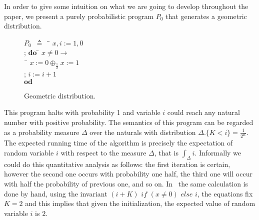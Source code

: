\documentclass{eptcs}
\theoremstyle{plain}
\theoremstyle{definition}
\newcommand{\Prg}{P}
\newcommand{\Def}{\ensuremath{\triangleq}}
\newcommand{\ra}{\ensuremath{\rightarrow}}
\newcommand{\DO}[0]{\textbf{do}}
\newcommand{\OD}[0]{\textbf{od}}
\begin{document}
In order to give some intuition on what we are going to develop throughout the paper, we present a purely probabilistic program $\Prg_0$ that generates a geometric distribution.
\begin{figure}[!ht]
\begin{center}
\begin{minipage}{\textwidth}
\begin{tabbing}
	$\Prg_0$\ $\Def$ \= \ \= $x,i:=1,0$ \\
	\>; \> $\DO$ \= $x\neq 0 \ra$ \\
	\>\>	\> \ \= $x:=0 \oplus_{\frac{1}{2}} x:=1$ \\
	\>\>	\> ; \> $i:=i+1$ \\
	\>\> $\OD$ 
\end{tabbing}
\end{minipage}
\end{center}
\caption{Geometric distribution.}\label{fig:ex_geomdist}
\end{figure}
This program halts with probability 1 and variable $i$ could reach any natural number with positive probability.
The semantics of this program can be regarded as a probability measure $\Delta$ over the naturals with distribution $\Delta.\{ K<i\} = \tfrac{1}{2^K}$.
The expected running time of the algorithm is precisely the expectation of random variable $i$ with respect to the measure $\Delta$, that is $\int_\Delta i$.
Informally we could do this quantitative analysis as follows:
the first iteration is certain, however the second one occurs with probability one half, the third one will occur with half the probability of previous one, and so on.
In~\cite[p.69]{morgan04arp} the same calculation is done by hand, using the invariant $(i+K) \textit{\ if\ } (x\neq 0) \textit{\ else\ } i$, the equations fix $K=2$ and this implies that given the initialization, the expected value of random variable $i$ is $2$.
\end{document}
